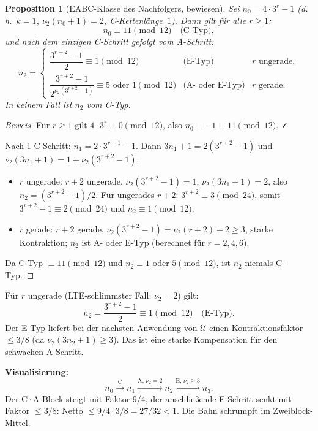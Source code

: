 \documentclass[12pt,a4paper]{article}
\newtheorem{proposition}[definition]{Proposition}
\newenvironment{beweis}{\begin{proof}[Beweis]}{\end{proof}}
\newcommand{\vii}{\nu_2}
\newcommand{\U}{\mathcal{U}}
\begin{document}
\begin{proposition}[EABC-Klasse des Nachfolgers, bewiesen]
\label{prop:spezial}
Sei $n_0 = 4\cdot 3^r - 1$ (d.\,h.\ $k=1$, $\vii(n_0+1) = 2$,
C-Kettenlänge~$1$). Dann gilt für alle $r \geq 1$:
\[
  n_0 \equiv 11 \pmod{12} \quad\text{(C-Typ)},
\]
und nach dem einzigen C-Schritt gefolgt vom A-Schritt:
\[
  n_2 =
  \begin{cases}
    \dfrac{3^{r+2}-1}{2} \equiv 1 \pmod{12} & \text{(E-Typ)} & r \text{ ungerade}, \\[4pt]
    \dfrac{3^{r+2}-1}{2^{\vii(3^{r+2}-1)}} \equiv 5 \text{ oder } 1 \pmod{12} & \text{(A- oder E-Typ)} & r \text{ gerade.}
  \end{cases}
\]
In \emph{keinem} Fall ist $n_2$ vom C-Typ.
\end{proposition}

\begin{beweis}
Für $r \geq 1$ gilt $4\cdot 3^r \equiv 0 \pmod{12}$, also
$n_0 \equiv -1 \equiv 11 \pmod{12}$. ✓

Nach 1 C-Schritt: $n_1 = 2\cdot 3^{r+1}-1$. Dann
$3n_1+1 = 2(3^{r+2}-1)$ und $\vii(3n_1+1) = 1+\vii(3^{r+2}-1)$.
\begin{itemize}
  \item $r$ ungerade: $r+2$ ungerade, $\vii(3^{r+2}-1)=1$,
    $\vii(3n_1+1)=2$, also $n_2 = (3^{r+2}-1)/2$.
    Für ungerades $r+2$: $3^{r+2} \equiv 3 \pmod{24}$, somit
    $3^{r+2}-1 \equiv 2 \pmod{24}$ und $n_2 \equiv 1 \pmod{12}$.
  \item $r$ gerade: $r+2$ gerade, $\vii(3^{r+2}-1)=\vii(r+2)+2\geq 3$,
    starke Kontraktion; $n_2$ ist A- oder E-Typ (berechnet für $r=2,4,6$).
\end{itemize}
Da C-Typ $\equiv 11\pmod{12}$ und $n_2 \equiv 1$ oder $5\pmod{12}$,
ist $n_2$ niemals C-Typ.
\end{beweis}

\begin{tcolorbox}[kernidee, title={Schlüsselbeobachtung: LTE-Worst-Case erzwingt E-Typ}]
Für $r$ ungerade (LTE-schlimmster Fall: $\vii = 2$) gilt:
\[
  n_2 = \frac{3^{r+2}-1}{2} \equiv 1 \pmod{12} \quad\text{(E-Typ)}.
\]
Der E-Typ liefert bei der nächsten Anwendung von $\U$ einen
Kontraktionsfaktor $\leq 3/8$ (da $\vii(3n_2+1) \geq 3$). Das ist
eine starke Kompensation für den schwachen A-Schritt.

\textbf{Visualisierung:}
\[
  n_0 \xrightarrow{\mathrm{C}} n_1 \xrightarrow{\mathrm{A},\,\vii=2} n_2
  \xrightarrow{\mathrm{E},\,\vii\geq 3} n_3.
\]
Der $\mathrm{C\cdot A}$-Block steigt mit Faktor $9/4$,
der anschließende E-Schritt senkt mit Faktor $\leq 3/8$:
Netto $\leq 9/4\cdot 3/8 = 27/32 < 1$. Die Bahn schrumpft
im Zweiblock-Mittel.
\end{tcolorbox}
\end{document}
